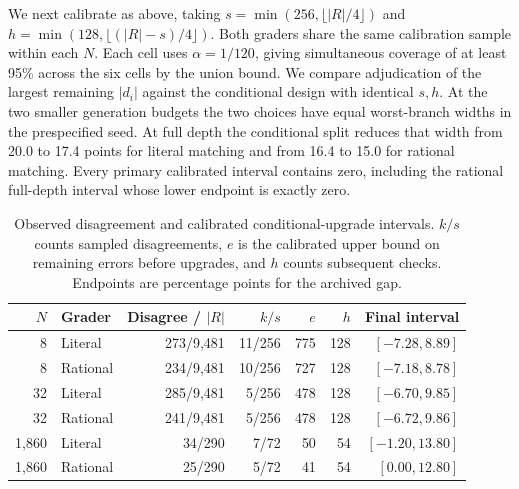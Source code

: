 We next calibrate as above, taking $s=\min(256,\lfloor |R|/4\rfloor)$ and $h=\min(128,\lfloor(|R|-s)/4\rfloor)$. Both graders share the same calibration sample within each $N$. Each cell uses $\alpha=1/120$, giving simultaneous coverage of at least 95\% across the six cells by the union bound. We compare adjudication of the largest remaining $|d_i|$ against the conditional design with identical $s,h$. At the two smaller generation budgets the two choices have equal worst-branch widths in the prespecified seed. At full depth the conditional split reduces that width from 20.0 to 17.4 points for literal matching and from 16.4 to 15.0 for rational matching. Every primary calibrated interval contains zero, including the rational full-depth interval whose lower endpoint is exactly zero.
\begin{table}[htbp]\centering\small
\caption{Observed disagreement and calibrated conditional-upgrade intervals. $k/s$ counts sampled disagreements, $e$ is the calibrated upper bound on remaining errors before upgrades, and $h$ counts subsequent checks. Endpoints are percentage points for the archived gap.}\label{tab:proxies}
\begin{tabular}{rlrrrrr}\toprule
$N$ & Grader & Disagree / $|R|$ & $k/s$ & $e$ & $h$ & Final interval\\\midrule
8 & Literal & 273/9,481 & 11/256 & 775 & 128 & $[-7.28,8.89]$\\
8 & Rational & 234/9,481 & 10/256 & 727 & 128 & $[-7.18,8.78]$\\
32 & Literal & 285/9,481 & 5/256 & 478 & 128 & $[-6.70,9.85]$\\
32 & Rational & 241/9,481 & 5/256 & 478 & 128 & $[-6.72,9.86]$\\
1,860 & Literal & 34/290 & 7/72 & 50 & 54 & $[-1.20,13.80]$\\
1,860 & Rational & 25/290 & 5/72 & 41 & 54 & $[0.00,12.80]$\\
\bottomrule\end{tabular}
\end{table}

